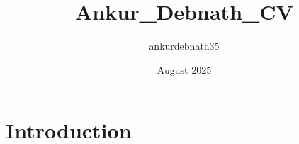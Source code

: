 \documentclass{article}
\title{Ankur_Debnath_CV}
\author{ankurdebnath35 }
\date{August 2025}
\begin{document}
\maketitle

\section{Introduction}
\end{document}

